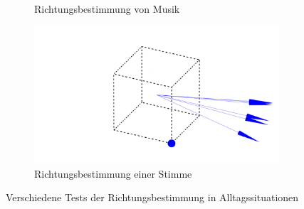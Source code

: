\begin{figure}[H]
\begin{subfigure}[b]{0.475\textwidth}
    \caption{Richtungsbestimmung von Musik\label{fig:music}}
  \end{subfigure}
  \hfill
  \begin{subfigure}[b]{0.475\textwidth}
    \centering
    \includegraphics[width=\textwidth]{img/sprechen.png}
    \caption{Richtungsbestimmung einer Stimme\label{fig:speech}}
  \end{subfigure}
  \caption{Verschiedene Tests der Richtungsbestimmung in Alltagssituationen\label{fig:tests}}
\end{figure}